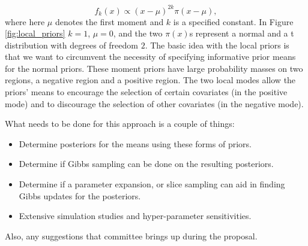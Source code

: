 \begin{equation}
f_k(x)\propto (x-\mu)^{2k}\pi(x-\mu),
\end{equation}
where here $\mu$ denotes the first moment and $k$ is a specified constant. In Figure \ref{fig:local_priors} $k=1$, $\mu=0$, and the two $\pi(x)$s represent a normal and a t distribution with degrees of freedom $2$. The basic idea with the local priors is that we want to circumvent the necessity of specifying informative prior means for the normal priors. These moment priors have large probability masses on two regions, a negative region and a positive region. The two local modes allow the priors' means to encourage the selection of certain covariates (in the positive mode) and to discourage the selection of other covariates (in the negative mode).

What needs to be done for this approach is a couple of things: 

\begin{itemize}
\item Determine posteriors for the means using these forms of priors. 
\item Determine if Gibbs sampling can be done on the resulting posteriors. 
\item Determine if a parameter expansion, or slice sampling can aid in finding Gibbs updates for the posteriors.  
\item Extensive simulation studies and hyper-parameter sensitivities.
\end{itemize}

Also, any suggestions that committee brings up during the proposal.

%
%
%
